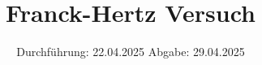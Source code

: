 

\subject{v601}
\title{Franck-Hertz Versuch}
\date{%
  Durchführung: 22.04.2025
  \hspace{3em}
  Abgabe: 29.04.2025
}



\maketitle
\thispagestyle{empty}
\tableofcontents
\newpage






\printbibliography{}


